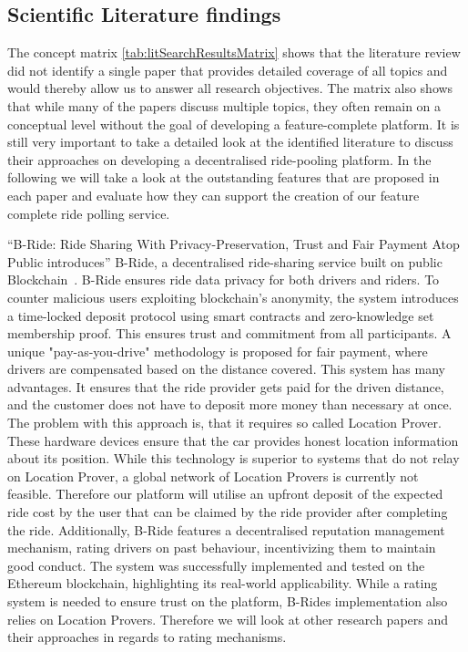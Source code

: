 \subsection{Scientific Literature findings}
The concept matrix \ref{tab:litSearchResultsMatrix} shows that the literature review did not identify a single paper that provides detailed coverage of all topics and would thereby allow us to answer all research objectives. The matrix also shows that while many of the papers discuss multiple topics, they often remain on a conceptual level without the goal of developing a feature-complete platform. It is still very important to take a detailed look at the identified literature to discuss their approaches on developing a decentralised ride-pooling platform. In the following we will take a look at the outstanding features that are proposed in each paper and evaluate how they can support the creation of our feature complete ride polling service.


``B-Ride: Ride Sharing With Privacy-Preservation, Trust and Fair Payment Atop Public
introduces'' B-Ride, a decentralised ride-sharing service built on public Blockchain~\cite{Baza.2021}. B-Ride ensures ride data privacy for both drivers and riders. To counter malicious users exploiting blockchain's anonymity, the system introduces a time-locked deposit protocol using smart contracts and zero-knowledge set membership proof. This ensures trust and commitment from all participants. A unique "pay-as-you-drive" methodology is proposed for fair payment, where drivers are compensated based on the distance covered. This 
system has many advantages. It ensures that the ride provider gets paid for the driven distance, and the customer does not have to deposit more money than necessary at once. The problem with this approach is, that it requires so called Location Prover. These hardware devices ensure that the car provides honest location information about its position. While this technology is superior to systems that do not relay on Location Prover, a global network of Location Provers is currently not feasible. Therefore our platform will utilise an upfront deposit of the expected ride cost by the user that can be claimed by the ride provider after completing the ride.
Additionally, B-Ride features a decentralised reputation management mechanism, rating drivers on past behaviour, incentivizing them to maintain good conduct. The system was successfully implemented and tested on the Ethereum blockchain, highlighting its real-world applicability. While a rating system is needed to ensure trust on the platform, B-Rides implementation also relies on Location Provers. Therefore we will look at other research papers and their approaches in regards to rating mechanisms.

